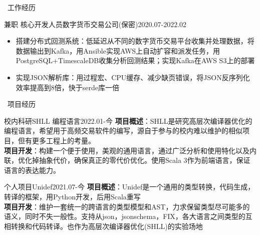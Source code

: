 \documentclass[UTF8]{resume}
\begin{document}
\begin{rSection}{\faBriefcase~工作经历}
\begin{rExperience}{兼职 核心开发人员}{数字货币交易公司(保密)}{2020.07-2022.02}
\begin{itemize}
            \item 搭建分布式回测系统：低延迟从不同的数字货币交易平台收集并处理数据，将数据输出到Kafka，用Ansible实现AWS上自动扩容和派发任务，用PostgreSQL+TimescaleDB收集分析回测结果；实现Kafka在AWS S3上的部署
            \item 实现JSON解析库：用过程宏、CPU缓存、减少缺页错误，将JSON反序列化效率提高到8倍，快于serde库一倍 
        \end{itemize}
    \end{rExperience}
\end{rSection}

\begin{rSection}{\faUsers~项目经历}

    \begin{rProject}{校内科研}{SHLL 编程语言}{2022.01-今}
        \textbf{项目概述}：SHLL是研究高层次编译器优化的编程语言，希望用于高频交易软件的编写，源自于参与的校内难以维护的相似项目，但有更多工程上的考量。\\
        \textbf{项目开发}：构建一个便于使用，美观的通用语言，通过广泛分析和使用特化以及内联，优化掉抽象代价，确保真正的零代价优化。使用Scala 3作为前端语言，保证语言的表达能力。
    \end{rProject}
    \begin{rProject}{个人项目}{Unidef}{2021.07-今}
        \textbf{项目概述}：Unidef是一个通用的类型转换，代码生成，转译的框架，用Python开发，后用Scala重写\\
        \textbf{项目开发}：维护一套统一的跨语言的类型模型和AST，力求保留类型尽可能多的语义，同时不失一般性。支持从json，jsonschema，FIX，各大语言之间类型的互相转换和代码转译。也作为高层次编译器优化(SHLL)的实验场地
    \end{rProject}



\end{rSection}
\end{document}
